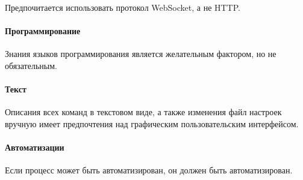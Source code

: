 Предпочитается использовать протокол WebSocket, а не HTTP.

\paragraph{Программирование}

Знания языков программирования является желательным фактором, но не обязательным.

\paragraph{Текст}

Описания всех команд в текстовом виде, а также изменения файл настроек вручную имеет предпочтения над графическим пользовательским интерфейсом.

\paragraph{Автоматизации}

Если процесс может быть автоматизирован, он должен быть автоматизирован.
